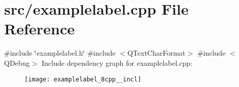 \section{src/examplelabel.cpp File Reference}
\label{examplelabel_8cpp}
{\ttfamily \#include \char`\"{}examplelabel.\+h\char`\"{}}\newline
{\ttfamily \#include $<$Q\+Text\+Char\+Format$>$}\newline
{\ttfamily \#include $<$Q\+Debug$>$}\newline
Include dependency graph for examplelabel.\+cpp\+:\nopagebreak
\begin{figure}[H]
\begin{center}
\leavevmode
\texttt{[image: examplelabel\_8cpp\_\_incl]}
\end{center}
\end{figure}
